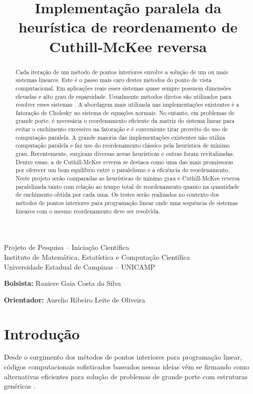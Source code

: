 \documentclass[12pt]{article}
\begin{document}
\title{Implementação paralela da heurística de reordenamento
de Cuthill-McKee reversa}
\maketitle

{\bf
\begin{center}
Projeto de Pesquisa -- Iniciação Científica\\
Instituto de Matemática, Estatística e Computação Científica\\
Universidade Estadual de Campinas -- UNICAMP
\end{center}
}

{\bf Bolsista:} Raniere Gaia Costa da Silva

{\bf Orientador:} Aurelio Ribeiro Leite de Oliveira

\begin{abstract}
Cada iteração de um método de pontos interiores envolve a solução
de um ou mais sistemas lineares. Este é o passo mais
caro destes métodos do ponto de vista computacional.
Em aplicações reais esses sistemas quase
sempre possuem dimensões elevadas e alto grau de esparsidade.
Usualmente métodos diretos são utilizados para resolver esses sistemas .
A abordagem mais utilizada nas implementações existentes é a fatoração
de Cholesky no sistema de equações normais.
No entanto, em problemas de grande porte, é necessária o reordenamento
eficiente da matriz do sistema linear para evitar o enchimento excessivo
na fatoração e é conveniente tirar proveito do uso de computação paralela.
A grande maioria das implementações existentes não utiliza computação paralela e
faz uso do reordenamento clássico pela heurística de mínimo grau.
Recentemente, surgiram diversas novas heurísticas e outras foram revitalizadas.
Dentre essas, a de Cuthill-McKee reversa se destaca como uma das mais
promissoras por oferecer um bom equilíbrio entre o paralelismo e a eficiência do
reordenamento.
Neste projeto serão comparadas as heurísticas de mínimo grau e Cuthill-McKee
reversa paralelizada tanto com relação ao tempo total de reordenamento quanto
na quantidade de enchimento obtida por cada uma. Os testes serão realizados
no contexto dos métodos de pontos interiores para programação linear
onde uma sequência de sistemas lineares com o mesmo reordenamento
deve ser resolvida.
\end{abstract}

\section{Introdução}
Desde o surgimento dos métodos de pontos interiores para programação linear,
códigos computacionais sofisticados baseados nessas ideias vêm se firmando como
alternativas eficientes para solução de problemas de grande porte com
estruturas genéricas \cite{ARVK89,BCO06,CMWW96,Go96,LMS92,OS03,OL91}.
\end{document}
